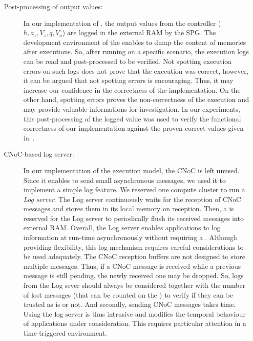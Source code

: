 \documentclass[main.tex]{subfiles}
\begin{document}
\begin{description}
    \item[Post-processing of output values: ] In our implementation of \rosace,
        the output values from the controller ($h , a_z , V_z , q , V_a$) are
        logged in the external RAM by the SPG. The development environment of
        the \mppalong enables to dump the content of memories after executions.
        So, after running \rosace on a specific scenario, the execution logs
        can be read and post-processed to be verified. Not spotting execution
        errors on such logs does not prove that the execution was correct,
        however, it can be argued that not spotting errors is encouraging.
        Thus, it may increase our confidence in the correctness of the
        implementation. On the other hand, spotting errors proves the
        non-correctness of the execution and may provide valuable informations
        for investigation. In our experiments, this post-processing of the
        logged value was used to verify the functional correctness of our
        \rosace implementation against the proven-correct values given
        in~\cite{Pagetti2014}.

    \item[CNoC-based log server: ] In our implementation of the execution
        model, the CNoC is left unused. Since it enables to send small
        asynchronous messages, we used it to implement a simple log feature. We
        reserved one compute cluster to run a \emph{Log server}. The Log server
        continuously waits for the reception of CNoC messages and stores them
        in its local memory on reception. Then, a \PC{} is reserved for the Log
        server to periodically flush its received messages into external RAM.
        Overall, the Log server enables applications to log information at
        run-time asynchronously without requiring a \PC{}.  Although providing
        flexibility, this log mechanism requires careful considerations to be
        used adequately. The CNoC reception buffers are not designed to store
        multiple messages. Thus, if a CNoC message is received while a previous
        message is still pending, the newly received one may be dropped. So,
        logs from the Log sever should always be considered together with the
        number of lost messages (that can be counted on the \mppalong) to
        verify if they can be trusted as is or not. And secondly, sending CNoC
        messages takes time. Using the log server is thus intrusive and
        modifies the temporal behaviour of applications under consideration.
        This requires particular attention in a time-triggered environment.


\end{description}
\end{document}
